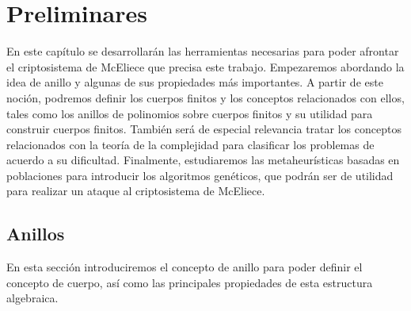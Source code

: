 
\chapter{Preliminares}

En este capítulo se desarrollarán las herramientas necesarias para poder afrontar el criptosistema de McEliece que precisa este trabajo. Empezaremos abordando la idea de anillo y algunas de sus propiedades más importantes. A partir de este noción, podremos definir los cuerpos finitos y los conceptos relacionados con ellos, tales como los anillos de polinomios sobre cuerpos finitos y su utilidad para construir cuerpos finitos. También será de especial relevancia tratar los conceptos relacionados con la teoría de la complejidad para clasificar los problemas de acuerdo a su dificultad. Finalmente, estudiaremos las metaheurísticas basadas en poblaciones para introducir los algoritmos genéticos, que podrán ser de utilidad para realizar un ataque al criptosistema de McEliece.

\section{Anillos}
En esta sección introduciremos el concepto de anillo para poder definir el concepto de cuerpo, así como las principales propiedades de esta estructura algebraica.

